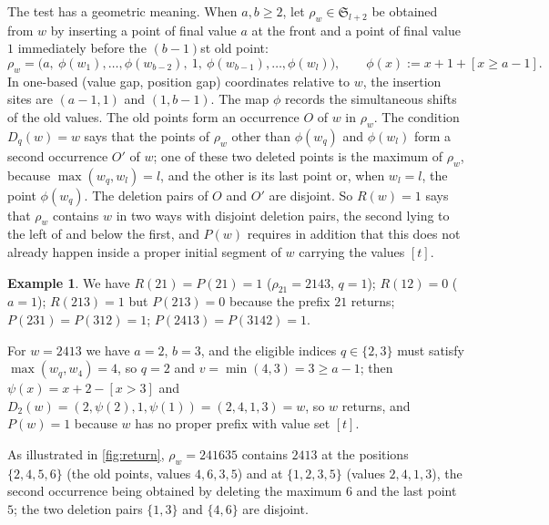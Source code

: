\documentclass[11pt,reqno]{amsart}
\theoremstyle{plain}
\theoremstyle{definition}
\newtheorem{example}[example]{Example}
\theoremstyle{remark}
\newcommand{\Sym}{\mathfrak{S}}
\begin{document}
The test has a geometric meaning. When $a,b\ge2$, let $\rho_w\in\Sym_{l+2}$ be obtained from $w$ by inserting a point of final value $a$ at the front and a point of final value $1$ immediately before the $(b-1)$st old point:
\[
\rho_w=\bigl(a,\ \phi(w_1),\dots,\phi(w_{b-2}),\ 1,\ \phi(w_{b-1}),\dots,\phi(w_l)\bigr),\qquad \phi(x):=x+1+[x\ge a-1].
\]
In one-based (value gap, position gap) coordinates relative to $w$, the insertion sites are $(a-1,1)$ and $(1,b-1)$. The map $\phi$ records the simultaneous shifts of the old values. The old points form an occurrence $O$ of $w$ in $\rho_w$. The condition $D_q(w)=w$ says that the points of $\rho_w$ other than $\phi(w_q)$ and $\phi(w_l)$ form a second occurrence $O'$ of $w$; one of these two deleted points is the maximum of $\rho_w$, because $\max(w_q,w_l)=l$, and the other is its last point or, when $w_l=l$, the point $\phi(w_q)$. The deletion pairs of $O$ and $O'$ are disjoint. So $R(w)=1$ says that $\rho_w$ contains $w$ in two ways with disjoint deletion pairs, the second lying to the left of and below the first, and $P(w)$ requires in addition that this does not already happen inside a proper initial segment of $w$ carrying the values $[t]$.

\begin{example}
We have $R(21)=P(21)=1$ ($\rho_{21}=2143$, $q=1$); $R(12)=0$ ($a=1$); $R(213)=1$ but $P(213)=0$ because the prefix $21$ returns; $P(231)=P(312)=1$; $P(2413)=P(3142)=1$.
\end{example}

For $w=2413$ we have $a=2$, $b=3$, and the eligible indices $q\in\{2,3\}$ must satisfy $\max(w_q,w_4)=4$, so $q=2$ and $v=\min(4,3)=3\ge a-1$; then $\psi(x)=x+2-[x>3]$ and $D_2(w)=(2,\psi(2),1,\psi(1))=(2,4,1,3)=w$, so $w$ returns, and $P(w)=1$ because $w$ has no proper prefix with value set $[t]$. 

As illustrated in \cref{fig:return}, $\rho_w=241635$ contains $2413$ at the positions $\{2,4,5,6\}$ (the old points, values $4,6,3,5$) and at $\{1,2,3,5\}$ (values $2,4,1,3$), the second occurrence being obtained by deleting the maximum $6$ and the last point $5$; the two deletion pairs $\{1,3\}$ and $\{4,6\}$ are disjoint.
\end{document}

